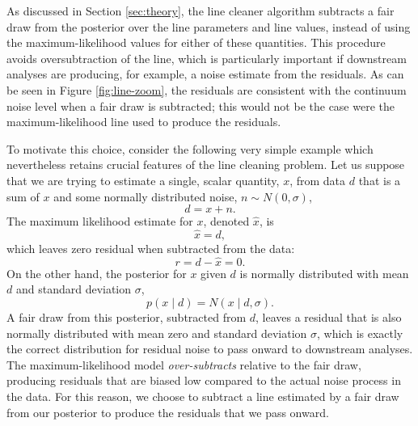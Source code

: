 \documentclass[modern]{aastex631}
\begin{document}
As discussed in Section \ref{sec:theory}, the line cleaner algorithm subtracts a
fair draw from the posterior over the line parameters and line values, instead
of using the maximum-likelihood values for either of these quantities.  This
procedure avoids oversubtraction of the line, which is particularly important if
downstream analyses are producing, for example, a noise estimate from the
residuals.  As can be seen in Figure \ref{fig:line-zoom}, the residuals are
consistent with the continuum noise level when a fair draw is subtracted; this
would not be the case were the maximum-likelihood line used to produce the
residuals.

To motivate this choice, consider the following very simple example which
nevertheless retains crucial features of the line cleaning problem.  Let us
suppose that we are trying to estimate a single, scalar quantity, $x$, from data
$d$ that is a sum of $x$ and some normally distributed noise, $n \sim
N(0,\sigma)$,
\begin{equation}
    d = x + n.
\end{equation}
The maximum likelihood estimate for $x$, denoted $\hat{x}$, is 
\begin{equation}
    \hat{x} = d,
\end{equation}
which leaves zero residual when subtracted from the data:
\begin{equation}
    r = d - \hat{x} = 0.
\end{equation}
On the other hand, the posterior for $x$ given $d$ is normally distributed with
mean $d$ and standard deviation $\sigma$,
\begin{equation}
    p(x \mid d) = N(x \mid d, \sigma).
\end{equation}
A fair draw from this posterior, subtracted from $d$, leaves a residual that is
also normally distributed with mean zero and standard deviation $\sigma$, which
is exactly the correct distribution for residual noise to pass onward to
downstream analyses.  The maximum-likelihood model \emph{over-subtracts}
relative to the fair draw, producing residuals that are biased low compared to
the actual noise process in the data.  For this reason, we choose to subtract a
line estimated by a fair draw from our posterior to produce the residuals that
we pass onward.



\end{document}
